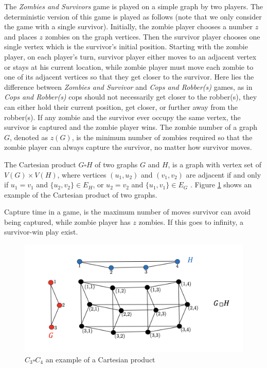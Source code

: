 \documentclass[1p]{elsarticle}
\begin{document}
The {\it Zombies and Survivors} game is played on a simple graph by two players. The deterministic version of this game
\cite{Fitz16} is played as follows (note that we only consider the game with a single survivor). Initially, the zombie
player chooses a number $z$ and places $z$ zombies on the graph vertices. Then the survivor player chooses one single
vertex which is the survivor's initial position. Starting with the zombie player, on each player's turn, survivor player
either moves to an adjacent vertex or stays at his current location, while zombie player must move each zombie to one of
its adjacent vertices so that they get closer to the survivor. Here lies the difference between {\it Zombies and
Survivor} and {\it Cops and Robber(s)} games, as in {\it Cops and Robber(s)} cops should not necessarily get closer to the
robber(s), they can either hold their current position, get closer, or further away from the robber(s). If any zombie
and the survivor ever occupy the same vertex, the survivor is captured and the zombie player wins. The zombie number of
a graph $G$, denoted as $z(G)$, is the minimum number of zombies required so that the zombie player can always capture
the survivor, no matter how survivor moves.

The Cartesian product $G \square H$ of two graphs $G$ and $H$, is a graph with vertex set of $V(G) \times V(H)$, where
vertices $(u_1 , u_2)$ and $(v_1 , v_2)$ are adjacent if and only if $u_1 = v_1$ and $ \{ u_2 , v_2 \} \in E_{H} $, or
$u_2 = v_2$ and $ \{u_1 , v_1 \} \in E_{G}$ \cite{West02}. Figure \ref{fig:p2} shows an example of the Cartesian product
of two graphs.

Capture time in a game, is the maximum number of moves survivor can avoid being captured, while zombie player has $z$
zombies. If this goes to infinity, a survivor-win play exist.

\begin{figure}[h!]
	\centering
	\includegraphics[width=0.9\linewidth]{fig/CpWest.png}
	\caption{$C_3 \square C_4$ an example of a Cartesian product}
	\label{fig:p2}
\end{figure}
\end{document}
